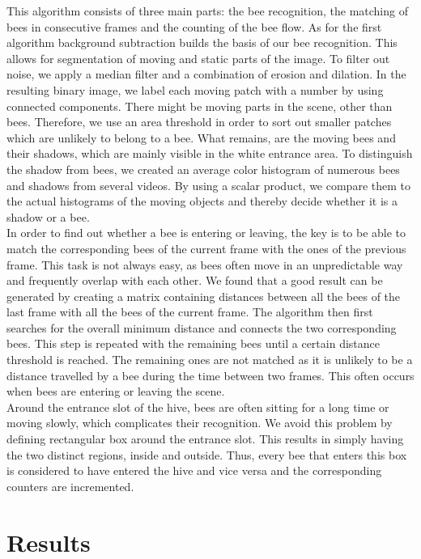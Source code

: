 \documentclass[10pt,twocolumn,letterpaper]{article}
\begin{document}
This algorithm consists of three main parts: the bee recognition, the matching of bees in consecutive frames and the counting of the bee flow. As for the first algorithm background subtraction builds the basis of our bee recognition. This allows for segmentation of moving and static parts of the image. To filter out noise, we apply a median filter and a combination of erosion and dilation. In the resulting binary image, we label each moving patch with a number by using connected components. There might be moving parts in the scene, other than bees. Therefore, we use an area threshold in order to sort out smaller patches which are unlikely to belong to a bee. What remains, are the moving bees and their shadows, which are mainly visible in the white entrance area. To distinguish the shadow from bees, we created an average color histogram of numerous bees and shadows from several videos. By using a scalar product, we compare them to the actual histograms of the moving objects and thereby decide whether it is a shadow or a bee.\\
In order to find out whether a bee is entering or leaving, the key is to be able to match the corresponding bees of the current frame with the ones of the previous frame. This task is not always easy, as bees often move in an unpredictable way and frequently overlap with each other. We found that a good result can be generated by creating a matrix containing distances between all the bees of the last frame with all the bees of the current frame. The algorithm then first searches for the overall minimum distance and connects the two corresponding bees. This step is repeated with the remaining bees until a certain distance threshold is reached. The remaining ones are not matched as it is unlikely to be a distance travelled by a bee during the time between two frames. This often occurs when bees are entering or leaving the scene.\\

Around the entrance slot of the hive, bees are often sitting for a long time or moving slowly, which complicates their recognition. We avoid this problem by defining rectangular box around the entrance slot. This results in simply having the two distinct regions, inside and outside. Thus, every bee that enters this box is considered to have entered the hive and vice versa and the corresponding counters are incremented.

\section{Results}
\end{document}

